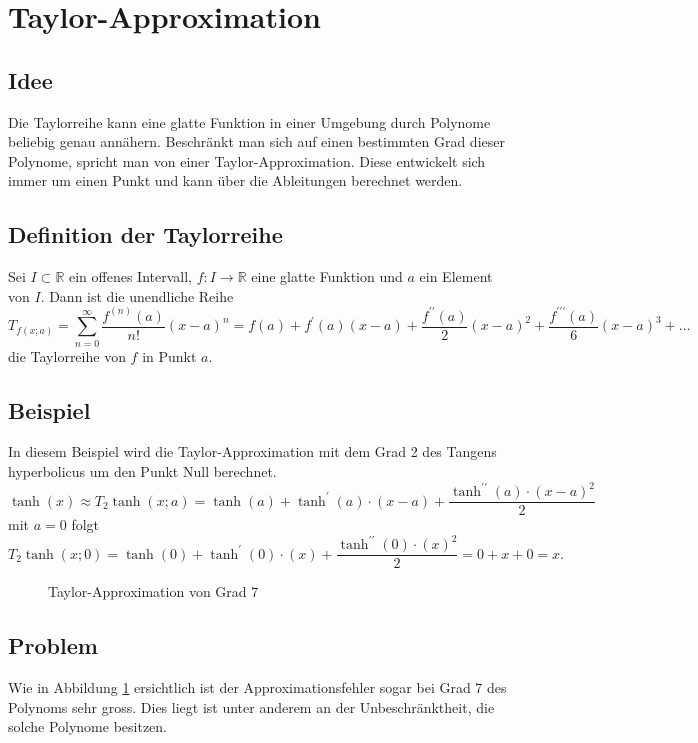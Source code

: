 %
%
%
\section{Taylor-Approximation
\label{transfer:section:teil1}}
\subsection{Idee}
Die Taylorreihe kann eine glatte Funktion in einer Umgebung durch Polynome beliebig genau annähern. Beschränkt man sich auf einen bestimmten Grad dieser Polynome, spricht man von einer Taylor-Approximation. Diese entwickelt sich immer um einen Punkt und kann über die Ableitungen berechnet werden.

\subsection{Definition der Taylorreihe}
Sei $I \subset \mathbb{R}$ ein offenes Intervall, $f: I \rightarrow \mathbb{R}$ eine glatte Funktion und $a$ ein Element von $I$. Dann ist die unendliche Reihe
\begin{equation}
	T_{f(x ; a)}=\sum_{n=0}^{\infty} \frac{f^{(n)}(a)}{n !}(x-a)^{n}=f(a)+f^{\prime}(a)(x-a)+\frac{f^{\prime \prime}(a)}{2}(x-a)^{2}+\frac{f^{\prime \prime \prime}(a)}{6}(x-a)^{3}+\ldots
\end{equation}
die Taylorreihe von $f$ in Punkt $a$.

\subsection{Beispiel}
In diesem Beispiel wird die Taylor-Approximation mit dem Grad 2 des Tangens hyperbolicus um den Punkt Null berechnet.
$$
	\tanh(x) \approx T_{2} \tanh(x ; a)=\tanh(a)+\tanh^{\prime}(a) \cdot(x-a)+\frac{\tanh^{\prime \prime}(a) \cdot(x-a)^{2}}{2}
$$
mit $a = 0$ folgt
$$
	T_{2} \tanh(x ; 0)=\tanh(0)+\tanh^{\prime}(0) \cdot(x)+\frac{\tanh^{\prime \prime}(0) \cdot(x)^{2}}{2} = 0 + x + 0 = x.
$$
\begin{figure}
\centering
{}
\caption{Taylor-Approximation von Grad 7
\label{motivation:figure:Taylor}}
\end{figure}

\subsection{Problem}
Wie in Abbildung \ref{motivation:figure:Taylor} ersichtlich ist der Approximationsfehler sogar bei Grad 7 des Polynoms sehr gross. Dies liegt ist unter anderem an der Unbeschränktheit, die solche Polynome besitzen. 
